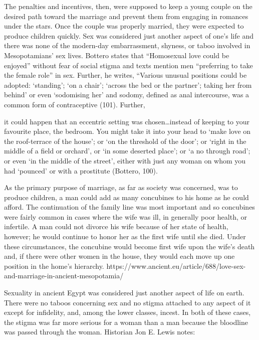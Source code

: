 \documentclass[11pt]{article}
\begin{document}
{The penalties and incentives, then, were supposed to keep a young couple on the desired path toward the marriage and prevent them from engaging in romances under the stars. Once the couple was properly married, they were expected to produce children quickly. Sex was considered just another aspect of one’s life and there was none of the modern-day embarrassment, shyness, or taboo involved in Mesopotamians' sex lives. Bottero states that “Homosexual love could be enjoyed” without fear of social stigma and texts mention men “preferring to take the female role” in sex. Further, he writes, “Various unusual positions could be adopted: `standing’; `on a chair’; `across the bed or the partner’; taking her from behind’ or even `sodomising her’ and sodomy, defined as anal intercourse, was a common form of contraceptive (101). Further,

it could happen that an eccentric setting was chosen…instead of keeping to your favourite place, the bedroom. You might take it into your head to `make love on the roof-terrace of the house’; or `on the threshold of the door’; or `right in the middle of a field or orchard’, or `in some deserted place’; or `a no through road’; or even `in the middle of the street’, either with just any woman on whom you had `pounced’ or with a prostitute (Bottero, 100).


As the primary purpose of marriage, as far as society was concerned, was to produce children, a man could add as many concubines to his home as he could afford. The continuation of the family line was most important and so concubines were fairly common in cases where the wife was ill, in generally poor health, or infertile. A man could not divorce his wife because of her state of health, however; he would continue to honor her as the first wife until she died. Under these circumstances, the concubine would become first wife upon the wife’s death and, if there were other women in the house, they would each move up one position in the home’s hierarchy.
https://www.ancient.eu/article/688/love-sex-and-marriage-in-ancient-mesopotamia/



Sexuality in ancient Egypt was considered just another aspect of life on earth. There were no taboos concerning sex and no stigma attached to any aspect of it except for infidelity, and, among the lower classes, incest. In both of these cases, the stigma was far more serious for a woman than a man because the bloodline was passed through the woman. Historian Jon E. Lewis notes:

}
\end{document}
